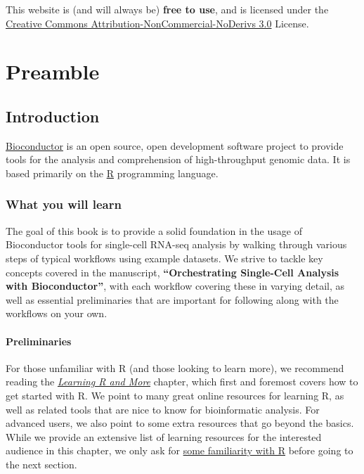 \documentclass[]{book}
\begin{document}
This website is (and will always be) \textbf{free to use}, and is licensed under the \href{http://creativecommons.org/licenses/by-nc-nd/3.0/us/}{Creative Commons Attribution-NonCommercial-NoDerivs 3.0} License.

\hypertarget{part-preamble}{%
\part{Preamble}\label{part-preamble}}

\hypertarget{introduction}{%
\chapter{Introduction}\label{introduction}}

\href{https://bioconductor.org}{Bioconductor} is an open source, open development software project to provide tools for the analysis and comprehension of high-throughput genomic data. It is based primarily on the \href{http://www.r-project.org/}{R} programming language.

\hypertarget{what-you-will-learn}{%
\section{What you will learn}\label{what-you-will-learn}}

The goal of this book is to provide a solid foundation in the usage of Bioconductor tools for single-cell RNA-seq analysis by walking through various steps of typical workflows using example datasets. We strive to tackle key concepts covered in the manuscript, \textbf{``Orchestrating Single-Cell Analysis with Bioconductor''}, with each workflow covering these in varying detail, as well as essential preliminaries that are important for following along with the workflows on your own.

\hypertarget{preliminaries}{%
\subsection{Preliminaries}\label{preliminaries}}

For those unfamiliar with R (and those looking to learn more), we recommend reading the \protect\hyperlink{learning-r-and-more}{\emph{Learning R and More}} chapter, which first and foremost covers how to get started with R. We point to many great online resources for learning R, as well as related tools that are nice to know for bioinformatic analysis. For advanced users, we also point to some extra resources that go beyond the basics. While we provide an extensive list of learning resources for the interested audience in this chapter, we only ask for \protect\hyperlink{getting-started-with-r}{some familiarity with R} before going to the next section.
\end{document}
